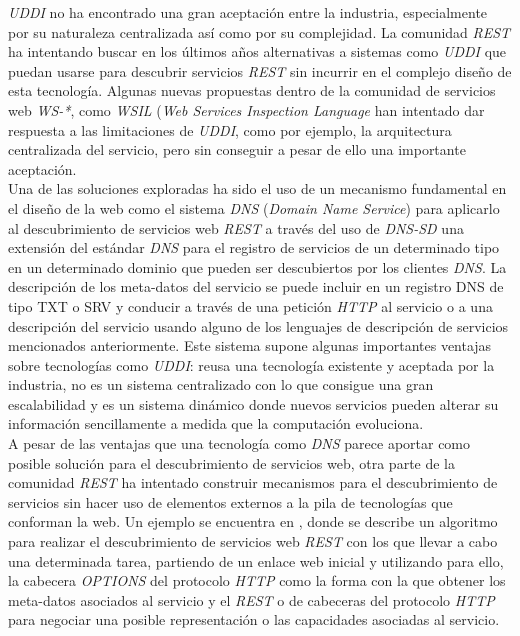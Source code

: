 \textit{UDDI} no ha encontrado una gran aceptaci\'on entre la industria, especialmente por su naturaleza centralizada as\'i como por su complejidad. La comunidad \textit{REST} ha intentando buscar en los \'ultimos a\~nos alternativas a sistemas como \textit{UDDI} que puedan usarse para descubrir servicios \textit{REST} sin incurrir en el complejo dise\~no de esta tecnolog\'ia. Algunas nuevas propuestas dentro de la comunidad de servicios web \textit{WS-*}, como \textit{WSIL} (\textit{Web Services Inspection Language} \cite{wsil} han intentado dar respuesta a las limitaciones de \textit{UDDI}, como por ejemplo, la arquitectura centralizada del servicio, pero sin conseguir a pesar de ello una importante aceptaci\'on.\\
Una de las soluciones exploradas ha sido el uso de un mecanismo fundamental en el dise\~no de la web como el sistema \textit{DNS} (\textit{Domain Name Service}) para aplicarlo al descubrimiento de servicios web \textit{REST} \cite{jara2012light} a trav\'es del uso de \textit{DNS-SD} una extensi\'on del est\'andar \textit{DNS} para el registro de servicios de un determinado tipo en un determinado dominio que pueden ser descubiertos por los clientes \textit{DNS}. La descripci\'on de los meta-datos del servicio se puede incluir en un registro DNS de tipo TXT o SRV y conducir a trav\'es de una petici\'on \textit{HTTP} al servicio o a una descripci\'on del servicio usando alguno de los lenguajes de descripci\'on de servicios mencionados anteriormente. Este sistema supone algunas importantes ventajas sobre tecnolog\'ias como \textit{UDDI}: reusa una tecnolog\'ia existente y aceptada por la industria, no es un sistema centralizado con lo que consigue una gran escalabilidad y es un sistema din\'amico donde nuevos servicios pueden alterar su informaci\'on sencillamente  a medida que la computaci\'on evoluciona.\\
A pesar de las ventajas que una tecnolog\'ia como \textit{DNS} parece aportar como posible soluci\'on para el descubrimiento de servicios web, otra parte de la comunidad \textit{REST} ha intentado construir mecanismos para el descubrimiento de servicios sin hacer uso de elementos externos a la pila de tecnolog\'ias que conforman la web. Un ejemplo se encuentra en \cite{verborgh2011description}, donde se describe un algoritmo para realizar el descubrimiento de servicios web \textit{REST} con los que llevar a cabo una determinada tarea, partiendo de un enlace web inicial y utilizando para ello, la cabecera \textit{OPTIONS} del protocolo \textit{HTTP} como la forma con la que obtener los meta-datos asociados al servicio y el \textit{REST} o de cabeceras del protocolo \textit{HTTP} para negociar una posible representaci\'on o las capacidades asociadas al servicio.
